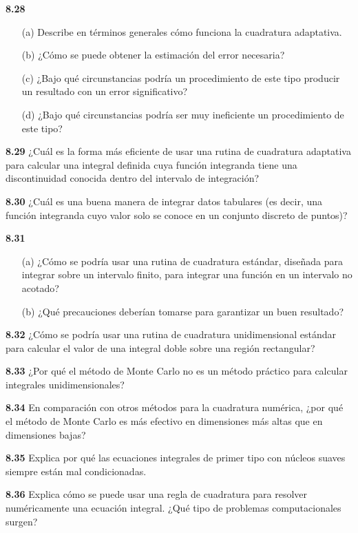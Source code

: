 \documentclass{article}
\begin{document}
\textbf{8.28}
\begin{itemize}
    \item[(a)] Describe en términos generales cómo funciona la cuadratura adaptativa.
    \item[(b)] ¿Cómo se puede obtener la estimación del error necesaria?
    \item[(c)] ¿Bajo qué circunstancias podría un procedimiento de este tipo producir un resultado con un error significativo?
    \item[(d)] ¿Bajo qué circunstancias podría ser muy ineficiente un procedimiento de este tipo?
\end{itemize}

\textbf{8.29} ¿Cuál es la forma más eficiente de usar una rutina de cuadratura adaptativa para calcular una integral definida cuya función integranda tiene una discontinuidad conocida dentro del intervalo de integración?

\textbf{8.30} ¿Cuál es una buena manera de integrar datos tabulares (es decir, una función integranda cuyo valor solo se conoce en un conjunto discreto de puntos)?

\textbf{8.31}
\begin{itemize}
    \item[(a)] ¿Cómo se podría usar una rutina de cuadratura estándar, diseñada para integrar sobre un intervalo finito, para integrar una función en un intervalo no acotado?
    \item[(b)] ¿Qué precauciones deberían tomarse para garantizar un buen resultado?
\end{itemize}

\textbf{8.32} ¿Cómo se podría usar una rutina de cuadratura unidimensional estándar para calcular el valor de una integral doble sobre una región rectangular?

\textbf{8.33} ¿Por qué el método de Monte Carlo no es un método práctico para calcular integrales unidimensionales?

\textbf{8.34} En comparación con otros métodos para la cuadratura numérica, ¿por qué el método de Monte Carlo es más efectivo en dimensiones más altas que en dimensiones bajas?

\textbf{8.35} Explica por qué las ecuaciones integrales de primer tipo con núcleos suaves siempre están mal condicionadas.

\textbf{8.36} Explica cómo se puede usar una regla de cuadratura para resolver numéricamente una ecuación integral. ¿Qué tipo de problemas computacionales surgen?
\end{document}
